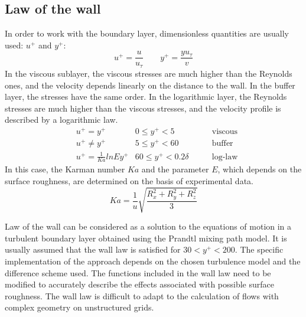 \subsection{Law of the wall}
	In order to work with the boundary layer, dimensionless quantities are usually used: $u^+$ and $y^+$:
	\begin{equation}
		u^+ = \frac{u}{u_\tau} \qquad y^+ = \frac{yu_\tau}{v}
	\end{equation}
	In the viscous sublayer, the viscous stresses are much higher than the Reynolds ones, and the velocity depends linearly on the distance to the wall. In the buffer layer, the stresses have the same order. In the logarithmic layer, the Reynolds stresses are much higher than the viscous stresses, and the velocity profile is described by a logarithmic law.
	\begin{align}
		&u^+ = y^+ & 0 \leq y^+ < 5 & \qquad\text{viscous} \nonumber\\
		&u^+ \neq y^+ & 5 \leq y^+ < 60 & \qquad\text{buffer} \nonumber\\
		&u^+ = \frac{1}{Ka}ln E y^+ & 60 \leq y^+ < 0.2\delta & \qquad\text{log-law}
	\end{align}
	In this case, the Karman number $Ka$ and the parameter $E$, which depends on the surface roughness, are determined on the basis of experimental data. 
	\begin{equation}
		Ka = \frac{1}{u}\sqrt{\frac{R_x^2 + R_y^2 + R_z^2}{3}}
	\end{equation}
	
	Law of the wall can be considered as a solution to the equations of motion in a turbulent boundary layer obtained using the Prandtl mixing path model. It is usually assumed that the wall law is satisfied for $30 < y^+ < 200$. The specific implementation of the approach depends on the chosen turbulence model and the difference scheme used. The functions included in the wall law need to be modified to accurately describe the effects associated with possible surface roughness. The wall law is difficult to adapt to the calculation of flows with complex geometry on unstructured grids.

